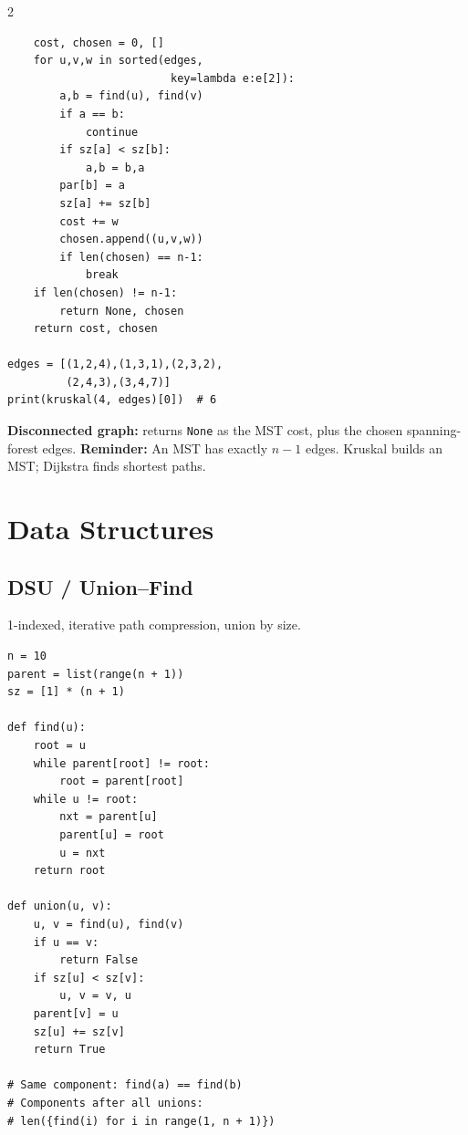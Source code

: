 \documentclass[9pt,a4paper]{extarticle}
\newcommand{\code}[1]{\texttt{#1}}
\begin{document}
\begin{multicols}{2}
\begin{minipage}[t]{\linewidth}
\begin{lstlisting}
    cost, chosen = 0, []
    for u,v,w in sorted(edges,
                         key=lambda e:e[2]):
        a,b = find(u), find(v)
        if a == b:
            continue
        if sz[a] < sz[b]:
            a,b = b,a
        par[b] = a
        sz[a] += sz[b]
        cost += w
        chosen.append((u,v,w))
        if len(chosen) == n-1:
            break
    if len(chosen) != n-1:
        return None, chosen
    return cost, chosen

edges = [(1,2,4),(1,3,1),(2,3,2),
         (2,4,3),(3,4,7)]
print(kruskal(4, edges)[0])  # 6
\end{lstlisting}
\textbf{Disconnected graph:} returns \code{None} as the
MST cost, plus the chosen spanning-forest edges.
\textbf{Reminder:} An MST has exactly $n-1$ edges.
Kruskal builds an MST; Dijkstra finds shortest paths.
\end{minipage}\par

\par\noindent\begin{minipage}[t]{\linewidth}
\section{Data Structures}

\subsection{DSU / Union--Find}
1-indexed, iterative path compression, union by size.
\begin{lstlisting}
n = 10
parent = list(range(n + 1))
sz = [1] * (n + 1)

def find(u):
    root = u
    while parent[root] != root:
        root = parent[root]
    while u != root:
        nxt = parent[u]
        parent[u] = root
        u = nxt
    return root

def union(u, v):
    u, v = find(u), find(v)
    if u == v:
        return False
    if sz[u] < sz[v]:
        u, v = v, u
    parent[v] = u
    sz[u] += sz[v]
    return True

# Same component: find(a) == find(b)
# Components after all unions:
# len({find(i) for i in range(1, n + 1)})
\end{lstlisting}
\end{minipage}\par

\end{multicols}
\endgroup
\end{document}
